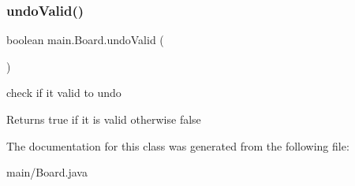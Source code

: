 \subsubsection{\texorpdfstring{undo\+Valid()}{undoValid()}}
{\footnotesize\ttfamily boolean main.\+Board.\+undo\+Valid (\begin{DoxyParamCaption}{ }\end{DoxyParamCaption})\hspace{0.3cm}{\ttfamily [inline]}}

check if it valid to undo \begin{DoxyReturn}{Returns}
true if it is valid otherwise false 
\end{DoxyReturn}


The documentation for this class was generated from the following file\+:\begin{DoxyCompactItemize}
\item 
main/Board.\+java\end{DoxyCompactItemize}
